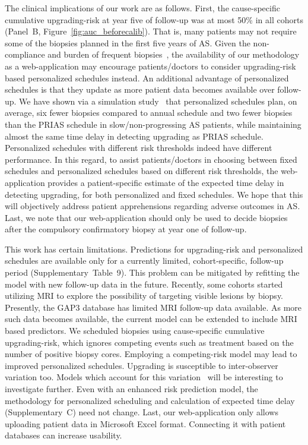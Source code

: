 The clinical implications of our work are as follows. First, the cause-specific cumulative upgrading-risk at year five of follow-up was at most 50\% in all cohorts (Panel~B, Figure~\ref{fig:auc_beforecalib}). That is, many patients may not require some of the biopsies planned in the first five years of AS. Given the non-compliance and burden of frequent biopsies~\citep{bokhorst2015compliance}, the availability of our methodology as a web-application may encourage patients/doctors to consider upgrading-risk based personalized schedules instead. An additional advantage of personalized schedules is that they update as more patient data becomes available over follow-up. We have shown via a simulation study~\citep{tomer2019personalized} that personalized schedules plan, on average, six fewer biopsies compared to annual schedule and two fewer biopsies than the PRIAS schedule in slow/non-progressing AS patients, while maintaining almost the same time delay in detecting upgrading as PRIAS schedule. Personalized schedules with different risk thresholds indeed have different performance. In this regard, to assist patients/doctors in choosing between fixed schedules and personalized schedules based on different risk thresholds, the web-application provides a patient-specific estimate of the expected time delay in detecting upgrading, for both personalized and fixed schedules. We hope that this will objectively address patient apprehensions regarding adverse outcomes in AS. Last, we note that our web-application should only be used to decide biopsies after the compulsory confirmatory biopsy at year one of follow-up.

This work has certain limitations. Predictions for upgrading-risk and personalized schedules are available only for a currently limited, cohort-specific, follow-up period (Supplementary~Table~9). This problem can be mitigated by refitting the model with new follow-up data in the future. Recently, some cohorts started utilizing MRI to explore the possibility of targeting visible lesions by biopsy. Presently, the GAP3 database has limited MRI follow-up data available. As more such data becomes available, the current model can be extended to include MRI based predictors. We scheduled biopsies using cause-specific cumulative upgrading-risk, which ignores competing events such as treatment based on the number of positive biopsy cores. Employing a competing-risk model may lead to improved personalized schedules. Upgrading is susceptible to inter-observer variation too. Models which account for this variation~\citep{coley2017prediction,balasubramanian2003estimation} will be interesting to investigate further. Even with an enhanced risk prediction model, the methodology for personalized scheduling and calculation of expected time delay (Supplementary~C) need not change. Last, our web-application only allows uploading patient data in Microsoft Excel format. Connecting it with patient databases can increase usability.